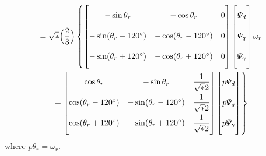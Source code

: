 \documentclass[a4paper,numbers=noenddot,12pt]{scrbook}
\begin{document}
        \begin{multline}
            [v_{abc}] = \sqrt*{\Big( \dfrac{2}{3} \Big)} 
            \left\{
                \begin{bmatrix}
                    -\sin \theta_r & -\cos \theta_r & 0 \vphantom{\dfrac{1}{\sqrt*{2}}}\\[2ex]
                    -\sin (\theta_r - 120^{\circ}) & -\cos (\theta_r - 120^{\circ}) & 0 \vphantom{\dfrac{1}{\sqrt*{2}}}\\[2ex]
                    -\sin (\theta_r + 120^{\circ}) & -\cos (\theta_r + 120^{\circ}) & 0 \vphantom{\dfrac{1}{\sqrt*{2}}}
                \end{bmatrix}
                \begin{bmatrix}
                    \varPsi_d \vphantom{\dfrac{1}{\sqrt*{2}}} \\[2ex] 
                    \varPsi_q \vphantom{\dfrac{1}{\sqrt*{2}}}\\[2ex]
                    \varPsi_{\gamma} \vphantom{\dfrac{1}{\sqrt*{2}}}
                \end{bmatrix}
                \omega_r
                \right.
                \\
                +
                \left.
                \begin{bmatrix}
                    \cos \theta_r & -\sin \theta_r & \dfrac{1}{\sqrt*{2}} \\[2ex]
                    \cos (\theta_r - 120^{\circ}) & -\sin (\theta_r - 120^{\circ}) & \dfrac{1}{\sqrt*{2}} \\[2ex]
                    \cos (\theta_r + 120^{\circ}) & -\sin (\theta_r + 120^{\circ}) & \dfrac{1}{\sqrt*{2}}
                \end{bmatrix}
                \begin{bmatrix}
                    p \varPsi_d \vphantom{\dfrac{1}{\sqrt*{2}}} \\[2ex] p \varPsi_q \vphantom{\dfrac{1}{\sqrt*{2}}}\\[2ex] p \varPsi_{\gamma} \vphantom{\dfrac{1}{\sqrt*{2}}}
                \end{bmatrix}
            \right\}
            \label{}
        \end{multline}
        where $p\theta_r = \omega_r$.
\end{document}
